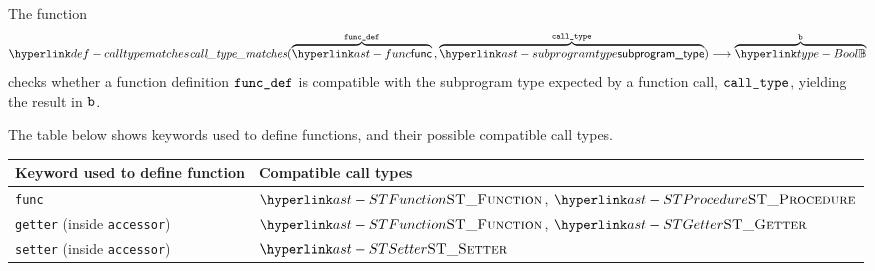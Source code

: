 \begin{mathpar}
\end{mathpar}

\hypertarget{def-calltypematches}{}
The function
\[
  \calltypematches(
    \overname{\func}{\funcdef} \aslsep
    \overname{\subprogramtype}{\calltype}
  )
  \aslto \overname{\Bool}{\vb}
\]
checks whether a function definition $\funcdef$ is compatible with the subprogram type expected by a function call, $\calltype$, yielding the result in $\vb$.

The table below shows keywords used to define functions, and their possible compatible call types.

\begin{center}
\begin{tabular}{ll}
\textbf{Keyword used to define function} & \textbf{Compatible call types} \\
\hline
\verb|func|                            & $\STFunction$, $\STProcedure$ \\
\verb|getter| (inside \verb|accessor|) & $\STFunction$, $\STGetter$    \\
\verb|setter| (inside \verb|accessor|) & $\STSetter$                   \\
\end{tabular}
\end{center}

